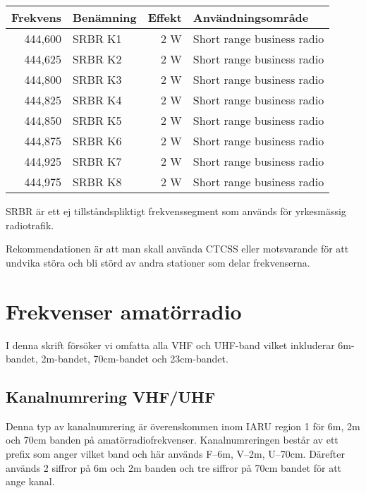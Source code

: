\begin{longtable}{rlrl}
	\textbf{Frekvens} & \textbf{Benämning} & \textbf{Effekt} & \textbf{Användningsområde} \\ \hline \endhead
	          444,600 & SRBR K1            & 2 W             & Short range business radio \\
	          444,625 & SRBR K2            & 2 W             & Short range business radio \\
	          444,800 & SRBR K3            & 2 W             & Short range business radio \\
	          444,825 & SRBR K4            & 2 W             & Short range business radio \\
	          444,850 & SRBR K5            & 2 W             & Short range business radio \\
	          444,875 & SRBR K6            & 2 W             & Short range business radio \\
	          444,925 & SRBR K7            & 2 W             & Short range business radio \\
	          444,975 & SRBR K8            & 2 W             & Short range business radio
\end{longtable}

SRBR är ett ej tillståndspliktigt frekvenssegment som används för yrkesmässig radiotrafik.

Rekommendationen är att man skall använda CTCSS eller motsvarande för att undvika störa och bli störd av andra stationer som delar frekvenserna.


\section{Frekvenser amatörradio}

I denna skrift försöker vi omfatta alla VHF och UHF-band vilket inkluderar 6m-bandet, 2m-bandet, 70cm-bandet och 23cm-bandet.

\subsection{Kanalnumrering VHF/UHF}

Denna typ av kanalnumrering är överenskommen inom IARU region 1 för 6m, 2m och 70cm banden på amatörradiofrekvenser. Kanalnumreringen består av ett prefix som anger vilket band och här används F--6m, V--2m, U--70cm. Därefter används 2 siffror på 6m och 2m banden och tre siffror på 70cm bandet för
att ange kanal.

